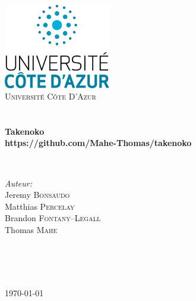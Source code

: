 \begin{titlepage}
\begin{center}

\includegraphics[width=0.35\textwidth]{./logo}~\\[1cm]

\textsc{\LARGE Université Côte D'Azur}\\[1.5cm]

\textsc{\Large }\\[0.5cm]

\HRule \\[0.4cm]

{\huge \bfseries Takenoko\\
https://github.com/Mahe-Thomas/takenoko \\[0.4cm] }

\HRule \\[1.5cm]

\begin{minipage}{0.4\textwidth}
\begin{flushleft} \large
\emph{Auteur:}\\
Jeremy \textsc{Bonsaudo}\\
Matthias \textsc{Percelay}\\
Brandon \textsc{Fontany--Legall}\\
Thomas \textsc{Mahe}
\end{flushleft}
\end{minipage}
\begin{minipage}{0.4\textwidth}
\begin{flushright} \large
\emph{} \\
 \textsc{}\\
\emph{} \\
 \textsc{}
\end{flushright}
\end{minipage}

\vfill

{\large \today}

\end{center}
\end{titlepage}